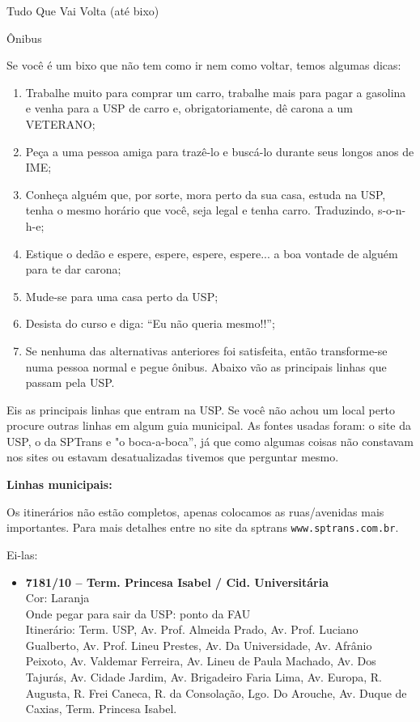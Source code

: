 \begin{secao}{Tudo Que Vai Volta (até bixo)}

\begin{subsecao}{Ônibus}

Se você é um bixo que não tem como ir nem como voltar, temos algumas dicas:

\begin{enumerate}
  \item Trabalhe muito para comprar um carro,
  trabalhe mais para pagar a gasolina e
  venha para a USP de carro e, obrigatoriamente, dê carona a um VETERANO;

  \item Peça a uma pessoa amiga para trazê-lo e buscá-lo durante seus
  longos anos de IME;

  \item Conheça alguém que, por sorte, mora perto da sua casa, estuda na USP,
  tenha o mesmo horário que você, seja legal e tenha carro. Traduzindo, s-o-n-h-e;

  \item Estique o dedão e espere, espere, espere, espere... a boa vontade
  de alguém para te dar carona;

  \item Mude-se para uma casa perto da USP;

  \item Desista do curso e diga: ``Eu não queria mesmo!!'';

  \item Se nenhuma das alternativas anteriores foi satisfeita, então
  transforme-se numa pessoa normal e pegue ônibus. Abaixo vão as
  principais linhas que passam pela USP.
\end{enumerate}

Eis as principais linhas que entram na USP. Se você não achou um local perto procure outras linhas em algum guia municipal. As fontes usadas foram: o site da USP, o da SPTrans e "o boca-a-boca”, já que como algumas coisas não constavam nos sites ou estavam desatualizadas tivemos que perguntar mesmo. 

{\bf Linhas municipais:}

Os itinerários não estão completos, apenas colocamos as ruas/avenidas mais
importantes. Para mais detalhes entre no site da sptrans 
{\tt www.sptrans.com.br}.

Ei-las:

\begin{itemize}

	\item {\bf 7181/10 – Term. Princesa Isabel / Cid. Universitária}\\
		Cor: Laranja\\
    	Onde pegar para sair da USP: ponto da FAU\\
    	Itinerário: Term. USP, Av. Prof. Almeida Prado, Av. Prof. Luciano
    	Gualberto, Av. Prof. Lineu Prestes, Av. Da Universidade, Av. Afrânio
    	Peixoto, Av. Valdemar Ferreira, Av. Lineu de Paula Machado, Av. Dos 
    	Tajurás, Av. Cidade Jardim, Av. Brigadeiro Faria Lima, Av. Europa, R. 
    	Augusta, R. Frei Caneca, R. da Consolação, Lgo. Do Arouche, Av. Duque
    	de Caxias, Term. Princesa Isabel.


\end{itemize}
\end{subsecao}
\end{secao}
